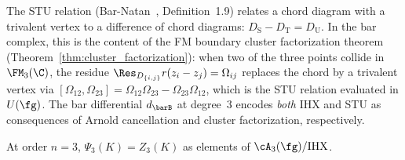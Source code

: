\begin{remark}
\label{rem:STU-from-bar}
The STU relation
(Bar-Natan~\cite{BarNatan95}, Definition~1.9) relates a chord
diagram with a trivalent vertex to a difference of chord
diagrams:
$D_{\mathrm{S}} - D_{\mathrm{T}} = D_{\mathrm{U}}$.
	In the bar complex, this is the content of the FM boundary
	cluster factorization theorem
(Theorem~\ref{thm:cluster_factorization}):
when two of the three points collide in $\FM_3(\C)$, the
residue $\Res_{D_{\{i,j\}}} r(z_i - z_j) = \Omega_{ij}$
replaces the chord by a trivalent vertex via
$[\Omega_{12}, \Omega_{23}] = \Omega_{12}\Omega_{23}
- \Omega_{23}\Omega_{12}$,
which is the STU relation evaluated in $U(\fg)$. The bar
differential $d_{\barB}$ at degree~$3$ encodes \emph{both}
IHX and STU as consequences of Arnold cancellation and
cluster factorization, respectively.
\end{remark}

\begin{proposition}
\label{prop:order-3-match}
At order $n = 3$, $\Psi_3(K) = Z_3(K)$ as elements of
$\cA_3(\fg)/\mathrm{IHX}$.
\end{proposition}

